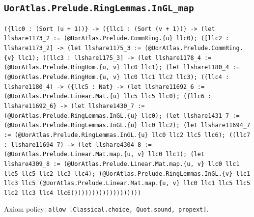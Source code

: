 \documentclass[11pt]{article}
\begin{document}
\subsection*{\texttt{UorAtlas.Prelude.RingLemmas.InGL\_map}}
\noindent\texttt{(\{llc0 : (Sort (u + 1))\} -> (\{llc1 : (Sort (v + 1))\} -> (let llshare1173\_2 := (@UorAtlas.Prelude.CommRing.\{u\} llc0); ([llc2 : llshare1173\_2] -> (let llshare1175\_3 := (@UorAtlas.Prelude.CommRing.\{v\} llc1); ([llc3 : llshare1175\_3] -> (let llshare1178\_4 := (@UorAtlas.Prelude.RingHom.\{u, v\} llc0 llc1); (let llshare1180\_4 := (@UorAtlas.Prelude.RingHom.\{u, v\} llc0 llc1 llc2 llc3); ((llc4 : llshare1180\_4) -> (\{llc5 : Nat\} -> (let llshare11692\_6 := (@UorAtlas.Prelude.Linear.Mat.\{u\} llc5 llc5 llc0); (\{llc6 : llshare11692\_6\} -> (let llshare1430\_7 := (@UorAtlas.Prelude.RingLemmas.InGL.\{u\} llc0); (let llshare1431\_7 := (@UorAtlas.Prelude.RingLemmas.InGL.\{u\} llc0 llc2); (let llshare11694\_7 := (@UorAtlas.Prelude.RingLemmas.InGL.\{u\} llc0 llc2 llc5 llc6); ((llc7 : llshare11694\_7) -> (let llshare4304\_8 := (@UorAtlas.Prelude.Linear.Mat.map.\{u, v\} llc0 llc1); (let llshare4309\_8 := (@UorAtlas.Prelude.Linear.Mat.map.\{u, v\} llc0 llc1 llc5 llc5 llc2 llc3 llc4); (@UorAtlas.Prelude.RingLemmas.InGL.\{v\} llc1 llc3 llc5 (@UorAtlas.Prelude.Linear.Mat.map.\{u, v\} llc0 llc1 llc5 llc5 llc2 llc3 llc4 llc6))))))))))))))))))))}\par
\noindent Axiom policy: \texttt{allow [Classical.choice, Quot.sound, propext]}.\par
\end{document}
